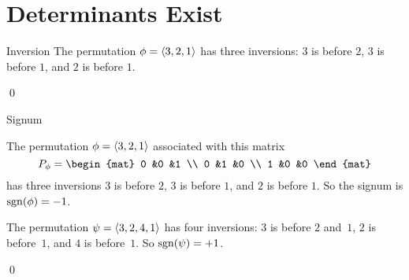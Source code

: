 \documentclass[10pt,t,serif,professionalfont]{beamer}
\begin{document}
\section{Determinants Exist}
\begin{frame}{Inversion}
\df[df:Inversion]
\pause
\ex The permutation $\phi=\langle3,2,1\rangle$ has three inversions:
$3$ is before $2$, $3$ is before $1$, and 
$2$ is before $1$.
\end{frame}




\begin{frame}
\lm[le:SwapsChangeSgn]

\pause
\pf
{}
\end{frame}
\begin{frame}
\end{frame}
\begin{frame}
\qed
\end{frame}




\begin{frame}{Signum}
\df[df:Signum]

\pause
\ex The permutation
$\phi=\langle3,2,1\rangle$
associated with this matrix 
\begin{equation*}
  P_{\phi}=
  \begin{mat}
    0 &0 &1 \\
    0 &1 &0 \\
    1 &0 &0
  \end{mat}
\end{equation*}
has three inversions
$3$ is before $2$, $3$ is before $1$, and 
$2$ is before $1$.
So the signum is $\operatorname{sgn}(\phi)=-1$.

\pause
\ex
The permutation $\psi=\langle3,2,4,1\rangle$
has four inversions: $3$ is before $2$ and~$1$,
$2$ is before~$1$, and $4$ is before~$1$.
So $\operatorname{sgn}(\psi)=+1$.
\end{frame}




\begin{frame}

\pause
\pf
{}
\qed
\end{frame}
\end{document}
